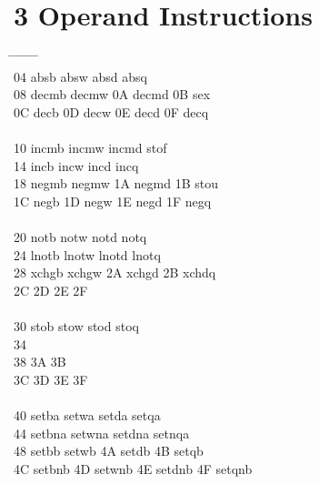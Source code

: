\documentclass[letterpaper,10pt,openright,twoside,onecolumn]{book}
\begin{document}
\newpage\section{3 Operand Instructions}
  \begin{tabbing}
    \makebox[\ncol]{00\hfill} \= 	\=
    \makebox[\ncol]{01\hfill} \= 	\=
    \makebox[\ncol]{02\hfill} \= 	\=
    \makebox[\ncol]{03\hfill} \= \\
    04 \> absb	 \> absw	 \> absd	 \> absq	\\
    08 \> decmb	 \> decmw	\> 0A \> decmd	\> 0B \> sex	\\
    0C \> decb	\> 0D \> decw	\> 0E \> decd	\> 0F \> decq	\\
    \\
    10 \> incmb	 \> incmw	 \> incmd	 \> stof	\\
    14 \> incb	 \> incw	 \> incd	 \> incq	\\
    18 \> negmb	 \> negmw	\> 1A \> negmd	\> 1B \> stou	\\
    1C \> negb	\> 1D \> negw	\> 1E \> negd	\> 1F \> negq	\\
    \\
    20 \> notb	 \> notw	 \> notd	 \> notq	\\
    24 \> lnotb	 \> lnotw	 \> lnotd	 \> lnotq	\\
    28 \> xchgb	 \> xchgw	\> 2A \> xchgd	\> 2B \> xchdq	\\
    2C \> 	\> 2D \> 	\> 2E \> 	\> 2F \> 	\\
    \\
    30 \> stob	 \> stow	 \> stod	 \> stoq	\\
    34 \> 	 \> 	 \> 	 \> 	\\
    38 \> 	 \> 	\> 3A \> 	\> 3B \> 	\\
    3C \> 	\> 3D \> 	\> 3E \> 	\> 3F \> 	\\
    \\
    40 \> setba	 \> setwa	 \> setda	 \> setqa	\\
    44 \> setbna \> setwna	 \> setdna	 \> setnqa	\\
    48 \> setbb	 \> setwb	\> 4A \> setdb	\> 4B \> setqb	\\
    4C \> setbnb\> 4D \> setwnb	\> 4E \> setdnb	\> 4F \> setqnb	\\

\end{tabbing}
\end{document}
